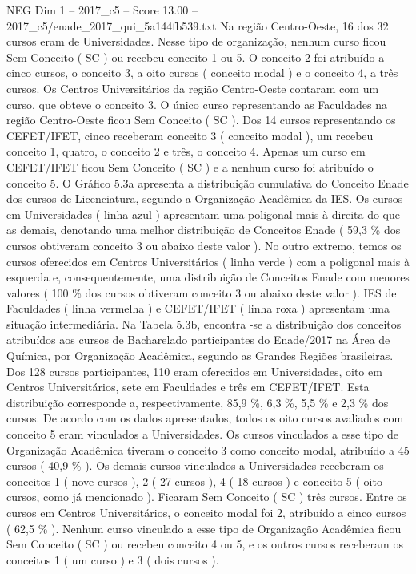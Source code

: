 \begin{textsample}{NEG Dim 1 – 2017\_c5 – Score 13.00 – 2017\_c5/enade\_2017\_qui\_5a144fb539.txt}
Na região Centro-Oeste, 16 dos 32 cursos eram de Universidades.
Nesse tipo de organização, nenhum curso ficou Sem Conceito ( SC ) ou recebeu conceito 1 ou 5.
O conceito 2 foi atribuído a cinco cursos, o conceito 3, a oito cursos ( conceito modal ) e o conceito 4, a três cursos.
Os Centros Universitários da região Centro-Oeste contaram com um curso, que obteve o conceito 3.
O único curso representando as Faculdades na região Centro-Oeste ficou Sem Conceito ( SC ).
Dos 14 cursos representando os CEFET/IFET, cinco receberam conceito 3 ( conceito modal ), um recebeu conceito 1, quatro, o conceito 2 e três, o conceito 4.
Apenas um curso em CEFET/IFET ficou Sem Conceito ( SC ) e a nenhum curso foi atribuído o conceito 5.
O Gráfico 5.3a apresenta a distribuição cumulativa do Conceito Enade dos cursos de Licenciatura, segundo a Organização Acadêmica da IES.
Os cursos em Universidades ( linha azul ) apresentam uma poligonal mais à direita do que as demais, denotando uma melhor distribuição de Conceitos Enade ( 59,3 \% dos cursos obtiveram conceito 3 ou abaixo deste valor ).
No outro extremo, temos os cursos oferecidos em Centros Universitários ( linha verde ) com a poligonal mais à esquerda e, consequentemente, uma distribuição de Conceitos Enade com menores valores ( 100 \% dos cursos obtiveram conceito 3 ou abaixo deste valor ).
IES de Faculdades ( linha vermelha ) e CEFET/IFET ( linha roxa ) apresentam uma situação intermediária.
Na Tabela 5.3b, encontra -se a distribuição dos conceitos atribuídos aos cursos de Bacharelado participantes do Enade/2017 na Área de Química, por Organização Acadêmica, segundo as Grandes Regiões brasileiras.
Dos 128 cursos participantes, 110 eram oferecidos em Universidades, oito em Centros Universitários, sete em Faculdades e três em CEFET/IFET.
Esta distribuição corresponde a, respectivamente, 85,9 \%, 6,3 \%, 5,5 \% e 2,3 \% dos cursos.
De acordo com os dados apresentados, todos os oito cursos avaliados com conceito 5 eram vinculados a Universidades.
Os cursos vinculados a esse tipo de Organização Acadêmica tiveram o conceito 3 como conceito modal, atribuído a 45 cursos ( 40,9 \% ).
Os demais cursos vinculados a Universidades receberam os conceitos 1 ( nove cursos ), 2 ( 27 cursos ), 4 ( 18 cursos ) e conceito 5 ( oito cursos, como já mencionado ).
Ficaram Sem Conceito ( SC ) três cursos.
Entre os cursos em Centros Universitários, o conceito modal foi 2, atribuído a cinco cursos ( 62,5 \% ).
Nenhum curso vinculado a esse tipo de Organização Acadêmica ficou Sem Conceito ( SC ) ou recebeu conceito 4 ou 5, e os outros cursos receberam os conceitos 1 ( um curso ) e 3 ( dois cursos ).

\end{textsample}
